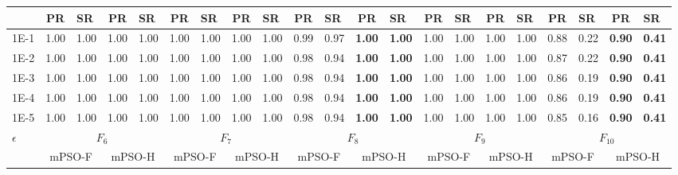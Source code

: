 \begin{table*}[h]
{\begin{tabular}{|p{4.8mm}|p{4.4mm}|p{4.4mm}|p{4.4mm}|p{4.4mm}|p{4.4mm}|p{4.4mm}|p{4.4mm}|p{4.4mm}|p{4.4mm}|p{4.4mm}|p{4.4mm}|p{4.4mm}|p{4.4mm}|p{4.4mm}|p{4.4mm}|p{4.4mm}|p{4.4mm}|p{4.4mm}|p{4.4mm}|p{4.4mm}|}
    \cline{2-21}
     & \multicolumn{1}{c|}{PR} & SR & \multicolumn{1}{c|}{PR} & SR & \multicolumn{1}{c|}{PR} & SR & \multicolumn{1}{c|}{PR} & SR & \multicolumn{1}{c|}{PR} & SR & \multicolumn{1}{c|}{PR} & SR & \multicolumn{1}{c|}{PR} & SR & \multicolumn{1}{c|}{PR} & SR & \multicolumn{1}{c|}{PR} & SR & \multicolumn{1}{c|}{PR} & SR \\
    \hline
    1E-1 & 1.00 & 1.00 & 1.00 & 1.00 & 1.00 & 1.00 & 1.00 & 1.00 & 0.99 & 0.97 & \textcolor{customblue}{\textbf{1.00}} & \textcolor{customblue}{\textbf{1.00}} & 1.00 & 1.00 & 1.00 & 1.00 & 0.88 & 0.22 & \textcolor{customblue}{\textbf{0.90}} & \textcolor{customblue}{\textbf{0.41}} \\
    1E-2 & 1.00 & 1.00 & 1.00 & 1.00 & 1.00 & 1.00 & 1.00 & 1.00 & 0.98 & 0.94 & \textcolor{customblue}{\textbf{1.00}} & \textcolor{customblue}{\textbf{1.00}} & 1.00 & 1.00 & 1.00 & 1.00 & 0.87 & 0.22 & \textcolor{customblue}{\textbf{0.90}} & \textcolor{customblue}{\textbf{0.41}} \\
    1E-3 & 1.00 & 1.00 & 1.00 & 1.00 & 1.00 & 1.00 & 1.00 & 1.00 & 0.98 & 0.94 & \textcolor{customblue}{\textbf{1.00}} & \textcolor{customblue}{\textbf{1.00}} & 1.00 & 1.00 & 1.00 & 1.00 & 0.86 & 0.19 & \textcolor{customblue}{\textbf{0.90}} & \textcolor{customblue}{\textbf{0.41}} \\
    1E-4 & 1.00 & 1.00 & 1.00 & 1.00 & 1.00 & 1.00 & 1.00 & 1.00 & 0.98 & 0.94 & \textcolor{customblue}{\textbf{1.00}} & \textcolor{customblue}{\textbf{1.00}} & 1.00 & 1.00 & 1.00 & 1.00 & 0.86 & 0.19 & \textcolor{customblue}{\textbf{0.90}} & \textcolor{customblue}{\textbf{0.41}} \\
    1E-5 & 1.00 & 1.00 & 1.00 & 1.00 & 1.00 & 1.00 & 1.00 & 1.00 & 0.98 & 0.94 & \textcolor{customblue}{\textbf{1.00}} & \textcolor{customblue}{\textbf{1.00}} & 1.00 & 1.00 & 1.00 & 1.00 & 0.85 & 0.16 & \textcolor{customblue}{\textbf{0.90}} & \textcolor{customblue}{\textbf{0.41}} \\
    \hline
    \multirow{3}{*}{$\epsilon$} & \multicolumn{4}{c|}{$F_{6}$} & \multicolumn{4}{c|}{$F_{7}$} & \multicolumn{4}{c|}{$F_{8}$} & \multicolumn{4}{c|}{$F_{9}$} & \multicolumn{4}{c|}{$F_{10}$} \\

    \cline{2-21}
    & \multicolumn{2}{c|}{mPSO-F} & \multicolumn{2}{c|}{mPSO-H} & \multicolumn{2}{c|}{mPSO-F} & \multicolumn{2}{c|}{mPSO-H} & \multicolumn{2}{c|}{mPSO-F} & \multicolumn{2}{c|}{mPSO-H} & \multicolumn{2}{c|}{mPSO-F} & \multicolumn{2}{c|}{mPSO-H} & \multicolumn{2}{c|}{mPSO-F} & \multicolumn{2}{c|}{mPSO-H} \\


\end{tabular}}
\end{table*}
